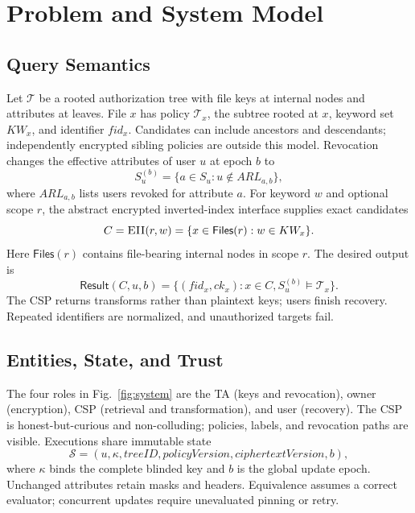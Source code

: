\documentclass[runningheads]{llncs}
\newif\ifmarkrevisions
\newenvironment{revision}{\par\begingroup\ifmarkrevisions\color{RevisionBlue}\fi}{\par\endgroup}
\newcommand{\EII}{\textsc{EII}}
\newcommand{\PolicyState}{\mathcal S}
\newcommand{\Result}{\mathsf{Result}}
\begin{document}
\section{Problem and System Model}
\begin{revision}
\subsection{Query Semantics}
Let $\mathcal T$ be a rooted authorization tree with file keys at internal
nodes and attributes at leaves. File $x$ has policy $\mathcal T_x$, the
subtree rooted at $x$, keyword set $KW_x$, and identifier $fid_x$.
Candidates can include ancestors and descendants; independently encrypted
sibling policies are outside this model. Revocation changes the effective
attributes of user $u$ at epoch $b$ to
\[
 S_u^{(b)}=\{a\in S_u:u\notin ARL_{a,b}\},
\]
where $ARL_{a,b}$ lists users revoked for attribute $a$.
For keyword $w$ and optional scope $r$, the abstract encrypted inverted-index
interface supplies exact candidates
\[
 C=\EII(r,w)=\{x\in\mathsf{Files}(r):w\in KW_x\}.
\]
Here $\mathsf{Files}(r)$ contains file-bearing internal nodes in scope $r$.
The desired output is
\[
 \Result(C,u,b)=\{(fid_x,ck_x):x\in C,
                 S_u^{(b)}\models\mathcal T_x\}.
\]
The CSP returns transforms rather than plaintext keys; users finish recovery.
Repeated identifiers are normalized, and unauthorized targets fail.

\subsection{Entities, State, and Trust}
The four roles in Fig.~\ref{fig:system} are the TA (keys and revocation),
owner (encryption), CSP (retrieval and transformation), and user (recovery).
The CSP is honest-but-curious and non-colluding; policies, labels, and
revocation paths are visible. Executions share immutable state
\[
 \PolicyState=(u,\kappa,\mathit{treeID},\mathit{policyVersion},
             \mathit{ciphertextVersion},b),
\]
where $\kappa$ binds the complete blinded key and $b$ is the global update
epoch. Unchanged attributes retain masks and headers. Equivalence assumes a
correct evaluator; concurrent updates require unevaluated pinning or retry.


\end{revision}
\end{document}
